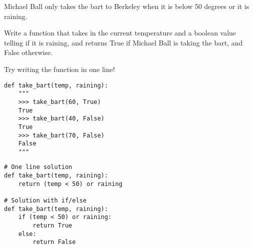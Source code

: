 \begin{blocksection}
\question Michael Ball only takes the bart to Berkeley when it is below 50 degrees or it is raining.

Write a function that takes in the current temperature and a boolean value telling if it is raining, and returns True if Michael Ball is taking the bart, and False otherwise.

Try writing the function in one line!

\begin{lstlisting}
def take_bart(temp, raining): 
    """
    >>> take_bart(60, True)
    True
    >>> take_bart(40, False)
    True
    >>> take_bart(70, False)
    False
    """

\end{lstlisting}

\begin{solution}[1.5in]
\begin{lstlisting}
# One line solution
def take_bart(temp, raining):
    return (temp < 50) or raining

# Solution with if/else
def take_bart(temp, raining):
    if (temp < 50) or raining:
    	return True
    else:
    	return False
\end{lstlisting}
\end{solution}
\end{blocksection}
